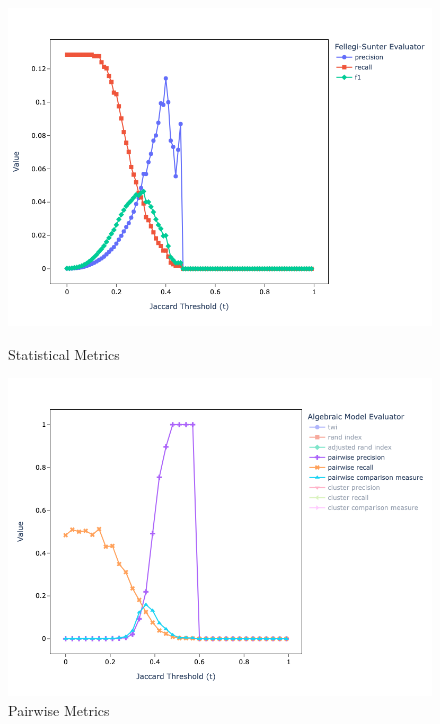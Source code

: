 \documentclass[11pt]{article}
\begin{document}
    \begin{figure}[h!]
        \begin{minipage}{0.49\textwidth}
            \centering
            \includegraphics[width=\textwidth]{full-fs}
            \caption{Statistical Metrics}
            \label{fig:full-fs}
        \end{minipage}
        \begin{minipage}{0.49\textwidth}
            \centering
            \includegraphics[width=\textwidth]{full-alg-pp}
            \caption{Pairwise Metrics}
            \label{fig:full-alg-pp}
        \end{minipage}    
        \begin{minipage}{0.49\textwidth}

\end{minipage}
\end{figure}
\end{document}
